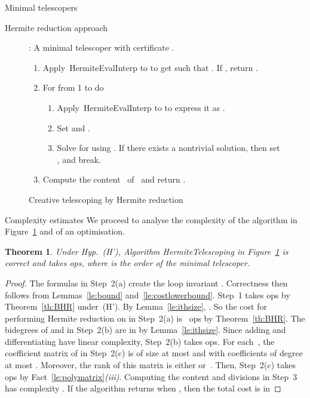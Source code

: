 \documentclass{sig-alt-full}
\newtheorem{theorem}[lemma]{Theorem}
\begin{document}
\begin{section}{Minimal telescopers}
\begin{subsection}{Hermite reduction approach}
\begin{figure}
{\begin{minipage}{8.1cm}
{\noindent {}:
A minimal telescoper  with certificate .
\begin{enumerate}
\item Apply~\textsf{HermiteEvalInterp} to  to get  such that .
If , return .
\item For  from 1 to  do
\begin{enumerate}
\item Apply~\textsf{HermiteEvalInterp} to 
  to express it as .
\item Set  and .
\item Solve  for 
  using \cite{Storjohann2005}.
If there exists a
nontrivial solution, then set , and break.
\end{enumerate}
\item Compute the content~ of~ and return
.
\end{enumerate}}
\end{minipage}}
\caption{Creative telescoping by Hermite reduction}
\label{fig:HRTelescoping}
\vskip-10pt
\end{figure}

\begin{subsubsection}{Complexity estimates}\label{sec:compl-estim}
We proceed to analyse the complexity of the algorithm in
Figure~\ref{fig:HRTelescoping} and of an optimisation.

\begin{theorem}
Under Hyp.~(H'), Algorithm
\textsf{HermiteTelescoping} in Figure~\ref{fig:HRTelescoping} is correct
and takes  ops,
where  is the order of the minimal telescoper.
\end{theorem}

\begin{proof}
The formulas in Step~2(a) create the loop invariant .
Correctness then follows from Lemmas~\ref{le:bound} and~\ref{le:costlowerbound}.
Step~1 takes  ops by Theorem~\ref{th:BHR} under~(H').
By Lemma~\ref{le:ithsize}, .
So the cost for performing Hermite reduction on
 in Step~2(a) is~
ops by Theorem~\ref{th:BHR}. The bidegrees of  and  in
Step~2(b) are in  by
Lemma~\ref{le:ithsize}. Since adding and differentiating have linear
complexity, Step~2(b) takes  ops.
For each~, the coefficient matrix of 
in Step~2(c) is of size at most  and with
coefficients of degree at most .
Moreover, the rank of this matrix is either  or~.
Then, Step~2(c) takes  ops by
Fact~\ref{le:polymatrix}\emph{(iii)}.
Computing the content and divisions in Step~3 has
complexity .
If the algorithm returns when
, then the total cost is in


\end{proof}
\end{subsubsection}
\end{subsection}
\end{section}
\end{document}
